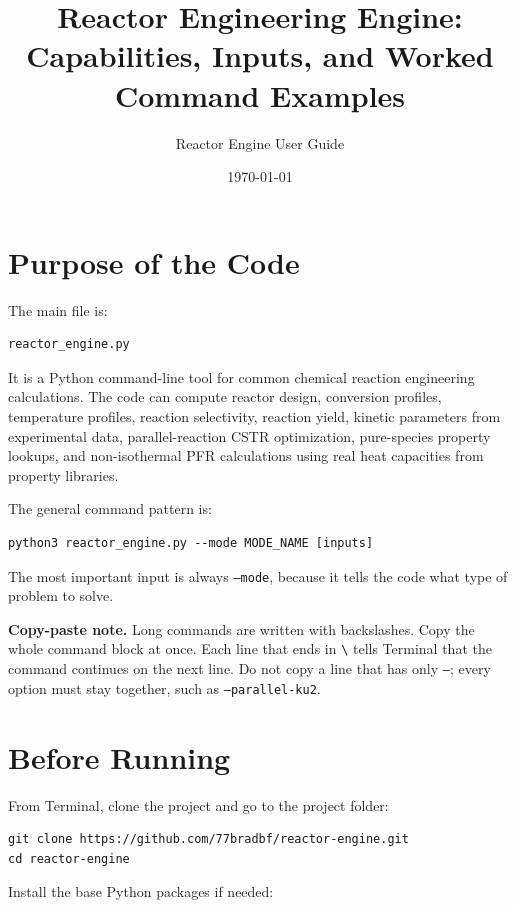 \documentclass[11pt]{article}
\title{Reactor Engineering Engine: Capabilities, Inputs, and Worked Command Examples}
\author{Reactor Engine User Guide}
\date{\today}
\begin{document}
\maketitle

\tableofcontents
\newpage

\section{Purpose of the Code}

The main file is:

\begin{lstlisting}
reactor_engine.py
\end{lstlisting}

It is a Python command-line tool for common chemical reaction engineering calculations. The code can compute reactor design, conversion profiles, temperature profiles, reaction selectivity, reaction yield, kinetic parameters from experimental data, parallel-reaction CSTR optimization, pure-species property lookups, and non-isothermal PFR calculations using real heat capacities from property libraries.

The general command pattern is:

\begin{lstlisting}
python3 reactor_engine.py --mode MODE_NAME [inputs]
\end{lstlisting}

The most important input is always \texttt{--mode}, because it tells the code what type of problem to solve.

\textbf{Copy-paste note.} Long commands are written with backslashes. Copy the whole command block at once. Each line that ends in \texttt{\textbackslash} tells Terminal that the command continues on the next line. Do not copy a line that has only \texttt{--}; every option must stay together, such as \texttt{--parallel-ku2}.

\section{Before Running}

From Terminal, clone the project and go to the project folder:

\begin{lstlisting}
git clone https://github.com/77bradbf/reactor-engine.git
cd reactor-engine
\end{lstlisting}

Install the base Python packages if needed:
\end{document}
